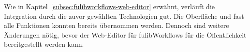 Wie in Kapitel~\ref{subsec:fulibworkflows-web-editor} erwähnt, verläuft die Integration durch die zuvor gewählten Technologien gut.
Die Oberfläche und fast alle Funktionen konnten bereits übernommen werden.
Dennoch sind weitere Änderungen nötig, bevor der Web-Editor für fulibWorkflows für die Öffentlichkeit bereitgestellt werden kann.
